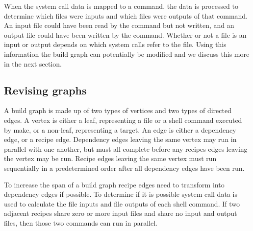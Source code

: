 \documentclass[sigconf,10pt,authorversion]{acmart}\settopmatter{printfolios=true,printccs=false,printacmref=false}
\begin{document}
When the system call data is mapped to a command, the data is processed to determine which
files were inputs and which files were outputs of that command.  An input file could have been
read by the command but not written, and an output file could have been written by the command.
Whether or not a file is an input or output depends on which system calls refer to the file.
Using this information the build graph can potentially be modified and we discuss this more
in the next section.




\subsection{Revising graphs}
\label{sec:revisegraphs}

A build graph is made up of two types of vertices and two types of directed edges.  A vertex is
either a leaf, representing a file or a shell command executed by make, or a non-leaf,
representing a target.  An edge is either a dependency edge, or a recipe edge.
Dependency edges leaving the same vertex may run in parallel with one another, but must all
complete before any recipes edges leaving the vertex may be run.  Recipe edges leaving the same
vertex must run sequentially in a predetermined order after all dependency edges have been run.

To increase the span of a build graph recipe edges need to transform into dependency
edges if possible.  To determine if it is possible system call data is used to calculate the
file inputs and file outputs of each shell command.  If two adjacent recipes share zero or more
input files and share no input and output files, then those two commands can run in parallel.
\end{document}
